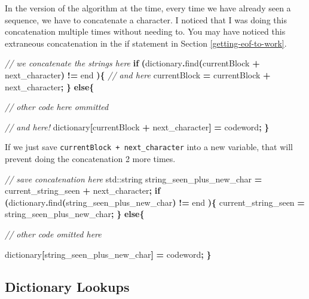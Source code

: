 \documentclass[12pt,twoside]{reedthesis}
\newenvironment{Shaded}{\begin{snugshade}}{\end{snugshade}}
\newcommand{\BuiltInTok}[1]{#1}
\newcommand{\CommentTok}[1]{\textcolor[rgb]{0.56,0.35,0.01}{\textit{#1}}}
\newcommand{\ControlFlowTok}[1]{\textcolor[rgb]{0.13,0.29,0.53}{\textbf{#1}}}
\newcommand{\NormalTok}[1]{#1}
\newcommand{\OperatorTok}[1]{\textcolor[rgb]{0.81,0.36,0.00}{\textbf{#1}}}
\begin{document}
In the version of the algorithm at the time, every time we have already seen a sequence, we have to concatenate a character. I noticed that I was doing this concatenation multiple times without needing to. You may have noticed this extraneous concatenation in the if statement in Section \ref{getting-eof-to-work}.
\begin{Shaded}
\begin{Highlighting}[]
\CommentTok{// we concatenate the strings here}
\ControlFlowTok{if} \OperatorTok{(}\NormalTok{dictionary}\OperatorTok{.}\NormalTok{find}\OperatorTok{(}\NormalTok{currentBlock }\OperatorTok{+}\NormalTok{ next\_character}\OperatorTok{)} \OperatorTok{!=}\NormalTok{ end }\OperatorTok{)\{}
    \CommentTok{// and here}
\NormalTok{    currentBlock }\OperatorTok{=}\NormalTok{ currentBlock }\OperatorTok{+}\NormalTok{ next\_character}\OperatorTok{;}
\OperatorTok{\}}
\ControlFlowTok{else}\OperatorTok{\{}

    \CommentTok{// other code here ommitted}


    \CommentTok{// and here! }
\NormalTok{    dictionary}\OperatorTok{[}\NormalTok{currentBlock }\OperatorTok{+}\NormalTok{ next\_character}\OperatorTok{]} \OperatorTok{=}\NormalTok{ codeword}\OperatorTok{;}
\OperatorTok{\}}
\end{Highlighting}
\end{Shaded}
If we just save \texttt{currentBlock\ +\ next\_character} into a new variable, that will prevent doing the concatenation 2 more times.
\begin{Shaded}
\begin{Highlighting}[]
\CommentTok{// save concatenation here}
\BuiltInTok{std::}\NormalTok{string}\OperatorTok{ }\NormalTok{string\_seen\_plus\_new\_char }\OperatorTok{=}\NormalTok{ current\_string\_seen }\OperatorTok{+}\NormalTok{ next\_character}\OperatorTok{;}
\ControlFlowTok{if} \OperatorTok{(}\NormalTok{dictionary}\OperatorTok{.}\NormalTok{find}\OperatorTok{(}\NormalTok{string\_seen\_plus\_new\_char}\OperatorTok{)} \OperatorTok{!=}\NormalTok{ end }\OperatorTok{)\{}
\NormalTok{    current\_string\_seen }\OperatorTok{=}\NormalTok{ string\_seen\_plus\_new\_char}\OperatorTok{;}
\OperatorTok{\}}
\ControlFlowTok{else}\OperatorTok{\{}

\CommentTok{// other code omitted here}

\NormalTok{    dictionary}\OperatorTok{[}\NormalTok{string\_seen\_plus\_new\_char}\OperatorTok{]} \OperatorTok{=}\NormalTok{ codeword}\OperatorTok{;}
\OperatorTok{\}}
\end{Highlighting}
\end{Shaded}
\hypertarget{dictionary-lookups}{%
\subsection{Dictionary Lookups}\label{dictionary-lookups}}
\end{document}
